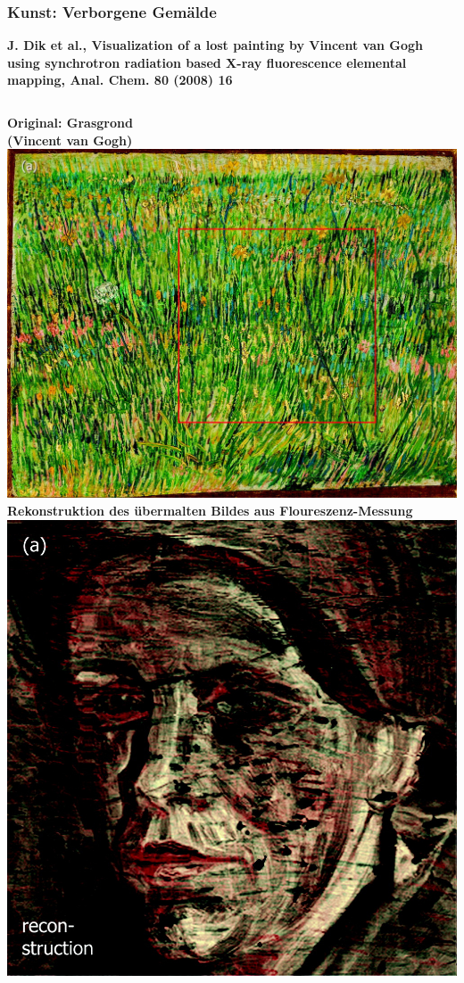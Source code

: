 \documentclass[10pt,t]{beamer}
\begin{document}
\begin{frame}
\begin{columns}
\end{columns}
\end{frame}


\begin{frame}
\frametitle{Kunst: Verborgene Gemälde}
\vspace*{-2.6\baselineskip}
\alert{\bfseries\footnotesize J. Dik et al., Visualization of a lost painting by Vincent van Gogh using synchrotron radiation based X-ray fluorescence elemental mapping, Anal. Chem. 80 (2008) 16}
\vspace*{0.5\baselineskip}
\begin{columns}
\textbf{Original: \glqq Grasgrond\grqq\\(Vincent van Gogh)} \\[1ex]
    \includegraphics[width=\textwidth]{vangogh-original}
\textbf{Rekonstruktion des übermalten Bildes aus Floureszenz-Messung} \\[1ex]
    \includegraphics[width=\textwidth]{vangogh-rekonstruktion}

\end{columns}
\end{frame}
\end{document}
